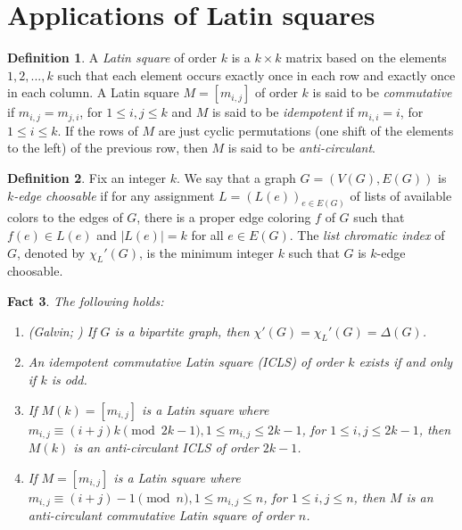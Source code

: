 \documentclass[12pt,reqno,a4paper]{amsart}
\theoremstyle{definition}
\newtheorem{defn}{Definition}[section]
\theoremstyle{plain}
\newtheorem{fact}[defn]{Fact}
\begin{document}
\section{Applications of Latin squares} 

\begin{defn}\label{Definition 4.1}
A {\em Latin square} of order $k$ is a $k \times k$ matrix based on the elements $1, 2,...,k$ such that each element occurs exactly once in each row and exactly once in each column. A Latin square $M = [m_{i,j}]$ of order $k$ is said to be {\em commutative} if $m_{i,j} = m_{j,i}$, for $1 \leq i, j \leq k$ and $M$ is said to be {\em idempotent} if $m_{i,i} = i$, for $1 \leq i \leq k$. If the rows of $M$ are just cyclic permutations (one shift of the elements to the left) of the previous row, then $M$ is said to be {\em anti-circulant}.
\end{defn}


\begin{defn}\label{Definition 4.2}
Fix an integer $k$. We say that a graph $G=(V(G), E(G))$ is {\em $k$-edge choosable} if for any assignment $L = (L(e))_{e\in E(G)}$ of lists of available colors to the edges of $G$, there is a proper edge coloring $f$ of $G$ such that $f(e) \in L(e)$ and $\vert L(e)\vert=k$ for all $e\in E(G)$. The {\em list chromatic index}
of $G$, denoted by $\chi_{L}'(G)$, is the minimum integer $k$ such that $G$ is $k$-edge choosable.  
\end{defn}

\begin{fact}\label{Fact 4.3}
The following holds:
\begin{enumerate}
    \item (Galvin; \cite{Gal1995}) If $G$ is a bipartite graph, then $\chi'(G)=\chi_{L}'(G)=\Delta(G)$.
 
    \item An idempotent commutative Latin square (ICLS) of order $k$ exists if and only if $k$ is odd.
    
    \item  If $M(k) = [m_{i,j}]$ is a Latin square where $m_{i,j} \equiv (i + j)k \pmod{2k - 1}, 1 \leq m_{i,j} \leq 2k - 1$, for $1 \leq i, j \leq 2k - 1$, then $M(k)$ is an anti-circulant ICLS of order $2k - 1$. 

    \item If $M = [m_{i,j}]$ is a Latin square where $m_{i,j} \equiv (i + j)-1 \pmod{n}, 1 \leq m_{i,j} \leq n$, for $1 \leq i, j \leq n$, then $M$ is an anti-circulant commutative Latin square of order $n$. 
\end{enumerate}
\end{fact}
\end{document}
